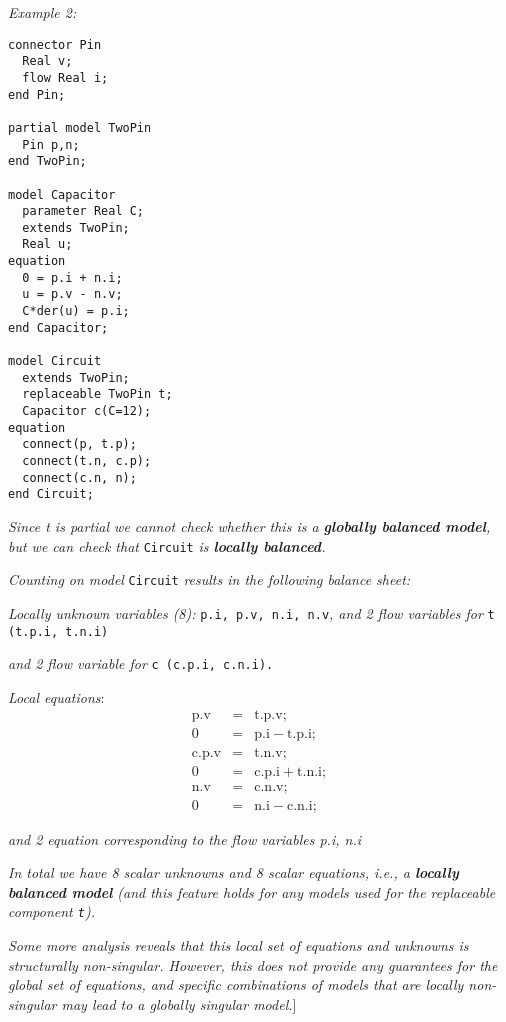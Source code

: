 \emph{Example 2:}

\begin{lstlisting}[language=modelica]
connector Pin
  Real v;
  flow Real i;
end Pin;

partial model TwoPin
  Pin p,n;
end TwoPin;

model Capacitor
  parameter Real C;
  extends TwoPin;
  Real u;
equation
  0 = p.i + n.i;
  u = p.v - n.v;
  C*der(u) = p.i;
end Capacitor;

model Circuit
  extends TwoPin;
  replaceable TwoPin t;
  Capacitor c(C=12);
equation
  connect(p, t.p);
  connect(t.n, c.p);
  connect(c.n, n);
end Circuit;
\end{lstlisting}

\emph{Since t is partial we cannot check whether this is a
\textbf{globally balanced model}, but we can check that} \lstinline!Circuit!
\emph{is \textbf{locally balanced}.}

\emph{Counting on model} \lstinline!Circuit! \emph{results in the following balance
sheet:}

\emph{Locally unknown variables (8):} \lstinline!p.i, p.v, n.i, n.v!\emph{, and 2
flow variables for} \lstinline!t (t.p.i, t.n.i)!

\emph{and 2 flow variable for} \lstinline!c (c.p.i, c.n.i).!

\emph{Local equations}:
\begin{eqnarray*} \text{p.v} &=& \text{t.p.v};\\
0 &=& \text{p.i}-\text{t.p.i};\\
\text{c.p.v} &=& \text{t.n.v};\\
0 &=& \text{c.p.i}+\text{t.n.i};\\
\text{n.v} &=& \text{c.n.v};\\
0 &=& \text{n.i}-\text{c.n.i};
\end{eqnarray*}

\emph{and 2 equation corresponding to the flow variables p.i, n.i}

\emph{In total we have 8 scalar unknowns and 8 scalar equations, i.e., a
\textbf{locally} \textbf{balanced model} (and this feature holds for any
models used for the replaceable component \lstinline!t!). }

\emph{Some more analysis reveals that this local set of equations and
unknowns is structurally non-singular. However, this does not provide
any guarantees for the global set of equations, and specific
combinations of models that are locally non-singular may lead to a
globally singular model.}{]}


